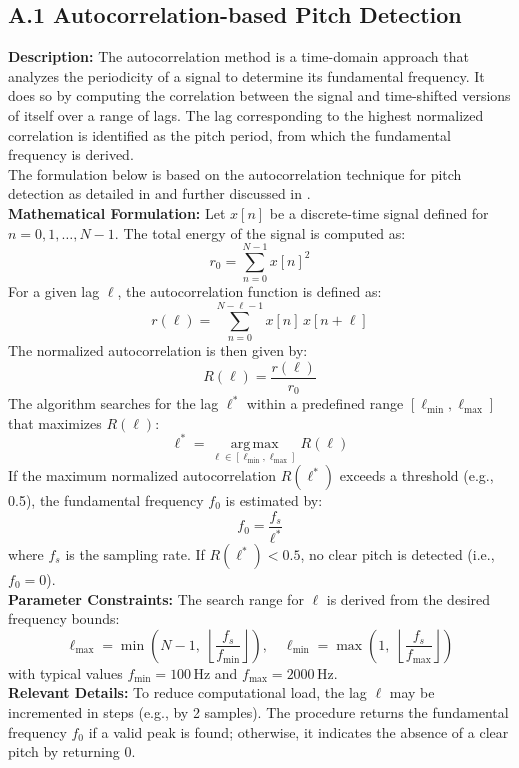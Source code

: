 \documentclass[12pt, titlepage]{article}
\begin{document}
\subsection*{A.1 Autocorrelation-based Pitch Detection}
\textbf{Description:} The autocorrelation method is a time-domain approach that analyzes the periodicity of a signal to determine 
its fundamental frequency. It does so by computing the correlation between the signal and time-shifted versions of itself over a 
range of lags. The lag corresponding to the highest normalized correlation is identified as the pitch period, from which the 
fundamental frequency is derived.\\
The formulation below is based on the autocorrelation technique for pitch detection as detailed in \cite{Rabiner-use} and further discussed in \cite{Rabiner-digital}.\\
\newline
\textbf{Mathematical Formulation:}  
Let \( x[n] \) be a discrete-time signal defined for \( n = 0, 1, \dots, N-1\). The total energy of the signal is computed as:
\[r_0 = \sum_{n=0}^{N-1} x[n]^2\]
For a given lag \( \ell \), the autocorrelation function is defined as:
\[r(\ell) = \sum_{n=0}^{N-\ell-1} x[n]\,x[n+\ell]\]
The normalized autocorrelation is then given by:
\[R(\ell) = \frac{r(\ell)}{r_0}\]
The algorithm searches for the lag \( \ell^* \) within a predefined range \([\ell_{\min}, \ell_{\max}]\) that maximizes \( R(\ell) \):
\[\ell^* = \operatorname*{arg\,max}_{\ell \in [\ell_{\min}, \ell_{\max}]} R(\ell)\]
If the maximum normalized autocorrelation \( R(\ell^*) \) exceeds a threshold (e.g., 0.5), the fundamental frequency \( f_0 \) is estimated by:
\[f_0 = \frac{f_s}{\ell^*}\]
where \( f_s \) is the sampling rate. If \( R(\ell^*) < 0.5 \), no clear pitch is detected (i.e., \( f_0 = 0 \)).\\
\newline
\textbf{Parameter Constraints:}  
The search range for \(\ell\) is derived from the desired frequency bounds:
\[\ell_{\max} = \min\left( N-1,\; \left\lfloor \frac{f_s}{f_{\min}} \right\rfloor \right), \quad
\ell_{\min} = \max\left( 1,\; \left\lfloor \frac{f_s}{f_{\max}} \right\rfloor \right)\]
with typical values \( f_{\min} = 100\,\text{Hz} \) and \( f_{\max} = 2000\,\text{Hz} \).\\
\newline
\textbf{Relevant Details:}  
To reduce computational load, the lag \( \ell \) may be incremented in steps (e.g., by 2 samples). The procedure returns the fundamental frequency \( f_0 \) if a valid peak is found; otherwise, it indicates the absence of a clear pitch by returning 0.
\end{document}
